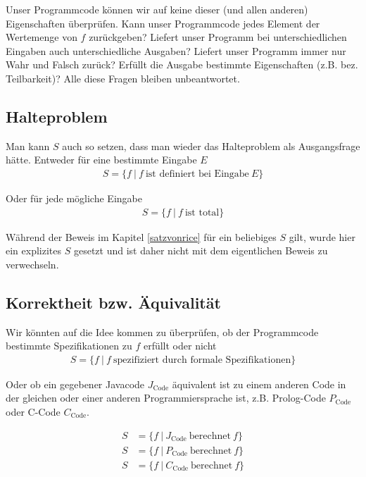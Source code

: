 \documentclass[journal]{IEEEtran}
\begin{document}
Unser Programmcode können wir auf keine dieser (und allen anderen) Eigenschaften überprüfen. Kann unser Programmcode jedes Element der Wertemenge von $f$ zurückgeben? Liefert unser Programm bei unterschiedlichen Eingaben auch unterschiedliche Ausgaben? Liefert unser Programm immer nur Wahr und Falsch zurück? Erfüllt die Ausgabe bestimmte Eigenschaften (z.B. bez. Teilbarkeit)? Alle diese Fragen bleiben unbeantwortet.

\subsection{Halteproblem}

Man kann $S$ auch so setzen, dass man wieder das Halteproblem als Ausgangsfrage hätte. Entweder für eine bestimmte Eingabe $E$
\begin{align*}
S = \{ f \ \vert \ f \ \text{ist definiert bei Eingabe} \ E \}
\end{align*}

Oder für jede mögliche Eingabe
\begin{align*}
S = \{ f \ \vert \ f \ \text{ist total} \}
\end{align*}

Während der Beweis im Kapitel \ref{satzvonrice} für ein beliebiges $S$ gilt, wurde hier ein explizites $S$ gesetzt und ist daher nicht mit dem eigentlichen Beweis zu verwechseln.

\subsection{Korrektheit bzw. Äquivalität}

Wir könnten auf die Idee kommen zu überprüfen, ob der Programmcode bestimmte Spezifikationen zu $f$ erfüllt oder nicht
\begin{align*}
S = \{f \ \vert \ f \ \text{spezifiziert durch formale Spezifikationen} \}
\end{align*}

Oder ob ein gegebener Javacode $J_\mathrm{Code}$ äquivalent ist zu einem anderen Code in der gleichen oder einer anderen Programmiersprache ist, z.B. Prolog-Code $P_\mathrm{Code}$ oder C-Code $C_\mathrm{Code}$.

\begin{align*}
S &= \{f \ \vert \ J_\mathrm{Code} \ \text{berechnet} \ f \} \\
S &= \{f \ \vert \ P_\mathrm{Code} \ \text{berechnet} \ f \} \\
S &= \{f \ \vert \ C_\mathrm{Code} \ \text{berechnet} \ f \}
\end{align*}
\end{document}
